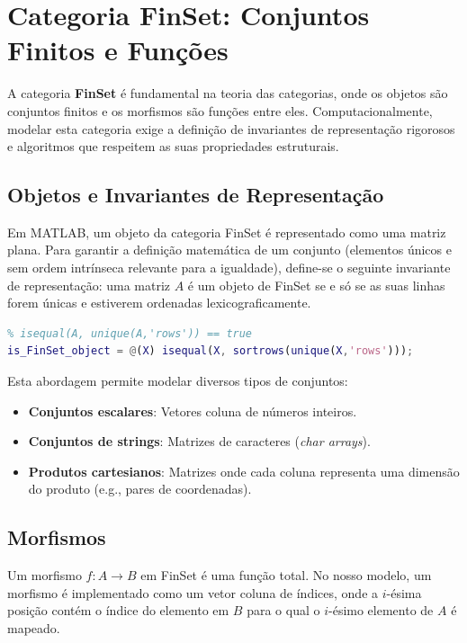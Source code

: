 
\section{Categoria FinSet: Conjuntos Finitos e Funções}
A categoria \textbf{FinSet} é fundamental na teoria das categorias, onde os objetos são conjuntos finitos e os morfismos são funções entre eles. Computacionalmente, modelar esta categoria exige a definição de invariantes de representação rigorosos e algoritmos que respeitem as suas propriedades estruturais.

\subsection{Objetos e Invariantes de Representação}
Em MATLAB, um objeto da categoria FinSet é representado como uma matriz plana. Para garantir a definição matemática de um conjunto (elementos únicos e sem ordem intrínseca relevante para a igualdade), define-se o seguinte invariante de representação: uma matriz $A$ é um objeto de FinSet se e só se as suas linhas forem únicas e estiverem ordenadas lexicograficamente.

\begin{lstlisting}[language=Matlab, caption={Definição do invariante de objetos em FinSet}]
% Um objeto de FinSet é uma matriz MATLAB A tal que:
% isequal(A, unique(A,'rows')) == true
is_FinSet_object = @(X) isequal(X, sortrows(unique(X,'rows')));
\end{lstlisting}

Esta abordagem permite modelar diversos tipos de conjuntos:
\begin{itemize}
    \item \textbf{Conjuntos escalares}: Vetores coluna de números inteiros.
    \item \textbf{Conjuntos de strings}: Matrizes de caracteres (\textit{char arrays}).
    \item \textbf{Produtos cartesianos}: Matrizes onde cada coluna representa uma dimensão do produto (e.g., pares de coordenadas).
\end{itemize}

\subsection{Morfismos}
Um morfismo $f: A \to B$ em FinSet é uma função total. No nosso modelo, um morfismo é implementado como um vetor coluna de índices, onde a $i$-ésima posição contém o índice do elemento em $B$ para o qual o $i$-ésimo elemento de $A$ é mapeado.

